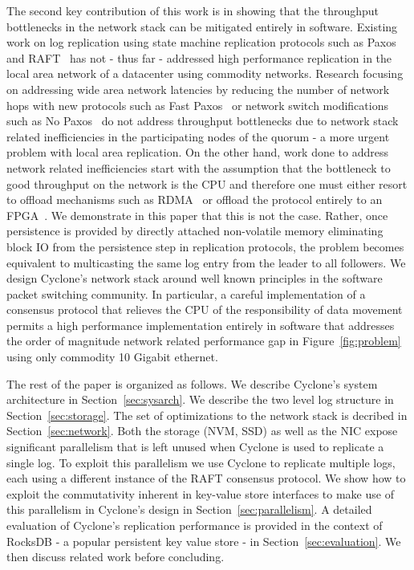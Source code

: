 \documentclass[pageno]{jpaper}
\begin{document}
The second key contribution of this work is in showing that the throughput
bottlenecks in the network stack can be mitigated entirely in software. Existing
work on log replication using state machine replication protocols such as
Paxos~\cite{paxos} and RAFT~\cite{raft} has not - thus far - addressed high
performance replication in the local area network of a datacenter using
commodity networks.  Research focusing on addressing wide area network latencies
by reducing the number of network hops with new protocols such as Fast
Paxos~\cite{fast-paxos} or network switch modifications such as No
Paxos~\cite{nopaxos} do not address throughput bottlenecks due to network stack
related inefficiencies in the participating nodes of the quorum - a more urgent
problem with local area replication. On the other hand, work done to address
network related inefficiencies start with the assumption that the bottleneck to
good throughput on the network is the CPU and therefore one must either resort
to offload mechanisms such as RDMA~\cite{dare, farm, faast} or offload the
protocol entirely to an FPGA~\cite{consensus_box}. We demonstrate in this paper
that this is not the case. Rather, once persistence is provided by directly
attached non-volatile memory eliminating block IO from the persistence step in
replication protocols, the problem becomes equivalent to multicasting the same
log entry from the leader to all followers. We design Cyclone's network stack
around well known principles in the software packet switching community. In
particular, a careful implementation of a consensus protocol that relieves the
CPU of the responsibility of data movement permits a high performance
implementation entirely in software that addresses the order of magnitude
network related performance gap in Figure~\ref{fig:problem} using only commodity
10 Gigabit ethernet.

The rest of the paper is organized as follows. We describe Cyclone's system
architecture in Section~\ref{sec:sysarch}. We describe the two level log
structure in Section~\ref{sec:storage}. The set of optimizations to the network
stack is decribed in Section~\ref{sec:network}. Both the storage (NVM, SSD) as
well as the NIC expose significant parallelism that is left unused when Cyclone
is used to replicate a single log. To exploit this parallelism we use Cyclone to
replicate multiple logs, each using a different instance of the RAFT consensus
protocol. We show how to exploit the commutativity inherent in key-value store
interfaces to make use of this parallelism in Cyclone's design in
Section~\ref{sec:parallelism}.  A detailed evaluation of Cyclone's replication
performance is provided in the context of RocksDB - a popular persistent key
value store - in Section~\ref{sec:evaluation}. We then discuss related work
before concluding.
\end{document}
